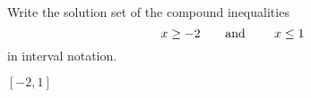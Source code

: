 

Write the solution set of the compound inequalities
\[x\geq -2 \text{\quad\quad and \quad\quad} x\leq 1 \]
in interval notation.

\begin{solution}
$[-2, 1]$
\end{solution}